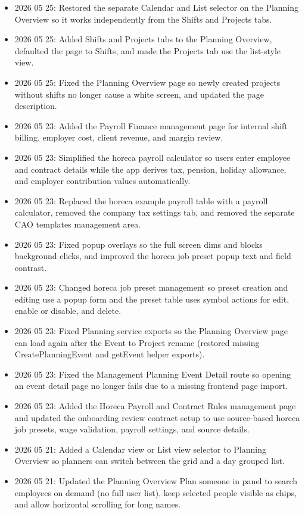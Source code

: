 \documentclass[11pt]{article}
\begin{document}
\begin{itemize}
    \item 2026 05 25: Restored the separate Calendar and List selector on the Planning Overview so it works independently from the Shifts and Projects tabs.
    \item 2026 05 25: Added Shifts and Projects tabs to the Planning Overview, defaulted the page to Shifts, and made the Projects tab use the list-style view.
    \item 2026 05 25: Fixed the Planning Overview page so newly created projects without shifts no longer cause a white screen, and updated the page description.
    \item 2026 05 23: Added the Payroll Finance management page for internal shift billing, employer cost, client revenue, and margin review.
    \item 2026 05 23: Simplified the horeca payroll calculator so users enter employee and contract details while the app derives tax, pension, holiday allowance, and employer contribution values automatically.
    \item 2026 05 23: Replaced the horeca example payroll table with a payroll calculator, removed the company tax settings tab, and removed the separate CAO templates management area.
    \item 2026 05 23: Fixed popup overlays so the full screen dims and blocks background clicks, and improved the horeca job preset popup text and field contrast.
    \item 2026 05 23: Changed horeca job preset management so preset creation and editing use a popup form and the preset table uses symbol actions for edit, enable or disable, and delete.
    \item 2026 05 23: Fixed Planning service exports so the Planning Overview page can load again after the Event to Project rename (restored missing CreatePlanningEvent and getEvent helper exports).
    \item 2026 05 23: Fixed the Management Planning Event Detail route so opening an event detail page no longer fails due to a missing frontend page import.
    \item 2026 05 23: Added the Horeca Payroll and Contract Rules management page and updated the onboarding review contract setup to use source-based horeca job presets, wage validation, payroll settings, and source details.
    \item 2026 05 21: Added a Calendar view or List view selector to Planning Overview so planners can switch between the grid and a day grouped list.
    \item 2026 05 21: Updated the Planning Overview Plan someone in panel to search employees on demand (no full user list), keep selected people visible as chips, and allow horizontal scrolling for long names.

\end{itemize}
\end{document}
